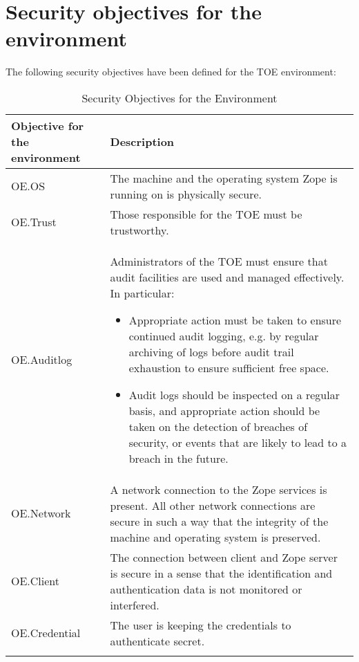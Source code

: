\documentclass[12pt,english]{scrbook}
\begin{document}



\section{Security objectives for the environment}

The following security objectives have been defined for the TOE environment:

\begin{longtable}[c]{lp{10cm}}
  \toprule
   Objective for the environment & Description \\
  
  \midrule\endhead

  OE.OS
   & 
  The machine and the operating system Zope is running
  on is physically secure.
   \\

  OE.Trust
   & 
  Those responsible for the TOE must be trustworthy.
   \\

  OE.Auditlog
   & 
  Administrators of the TOE must ensure that audit
  facilities are used and managed effectively. In
  particular:

  \begin{itemize}
  
    \item Appropriate action must be taken to ensure continued audit logging,
    e.g. by regular archiving of logs before audit trail exhaustion to ensure
    sufficient free space.

    \item Audit logs should be inspected on a regular basis, and appropriate
    action should be taken on the detection of breaches of security, or events
    that are likely to lead to a breach in the future.

  \end{itemize}
   \\

  OE.Network
   & 
  A network connection to the Zope services is present.
  All other network connections are secure in such a
  way that the integrity of the machine and operating
  system is preserved.
   \\

  OE.Client
   & 
  The connection between client and Zope server is secure
  in a sense that the identification and authentication
  data is not monitored or interfered.
   \\

  OE.Credential
   & 
  The user is keeping the credentials to authenticate
  secret.
  \\
  \bottomrule
  \caption{Security Objectives for the Environment}
\end{longtable}
\end{document}
